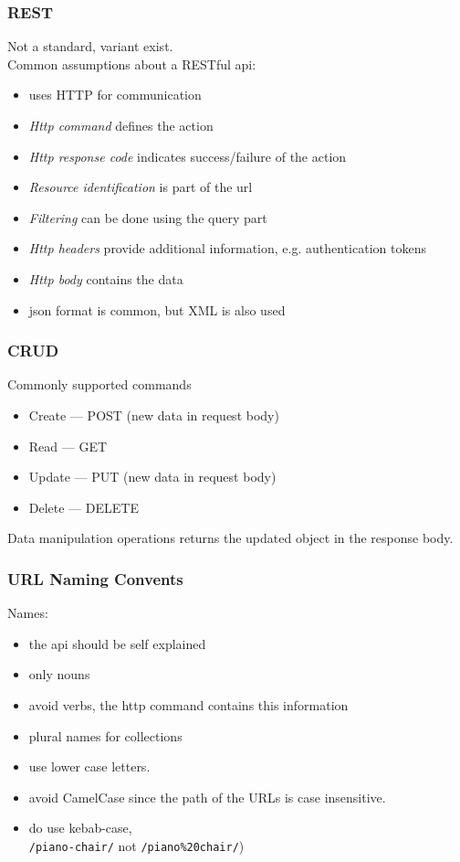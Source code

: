\begin{frame}[fragile]
\frametitle{REST}
Not a standard, variant exist.
\vspace{3mm}
\\Common assumptions about a RESTful api:
\begin{itemize}
  \item uses HTTP for communication
  \item \emph{Http command} defines the action
  \item \emph{Http response code} indicates success/failure of the action
  \item \emph{Resource identification} is part of the url
  \item \emph{Filtering} can be done using the query part
  \item \emph{Http headers} provide additional information, e.g. authentication tokens
  \item \emph{Http body} contains the data
  \item {json format} is common, but XML is also used
\end{itemize}
\end{frame}


\begin{frame}[fragile]
\frametitle{CRUD}
Commonly supported commands
\begin{itemize}
  \item Create --- POST (new data in request body)
  \item Read --- GET
  \item Update --- PUT (new data in request body)
  \item Delete --- DELETE
\end{itemize}
\vspace{5mm}
Data manipulation operations returns the updated object in the response body.
\end{frame}

\begin{frame}[fragile]
\frametitle{URL Naming Convents}
\color{structure}
\noindent Names:
\begin{itemize}\color{structure}
  \item the api should be self explained
  \item only nouns
  \item avoid verbs, the http command contains this information
  \item plural names for collections
  \item use lower case letters.
  \item avoid CamelCase since the path of the URLs is case insensitive.
  \item do use kebab-case,\\  \texttt{/piano-chair/} not \texttt{/piano\%20chair/})
\end{itemize}
\end{frame}

